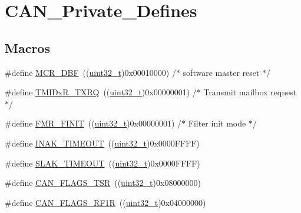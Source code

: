 \hypertarget{group___c_a_n___private___defines}{}\section{C\+A\+N\+\_\+\+Private\+\_\+\+Defines}
\label{group___c_a_n___private___defines}
\subsection*{Macros}
\begin{DoxyCompactItemize}
\item 
\#define \hyperlink{group___c_a_n___private___defines_ga1ded3736beb63c49281f2983fc68c36d}{M\+C\+R\+\_\+\+D\+BF}~((\hyperlink{_p_e___types_8h_a33594304e786b158f3fb30289278f5af}{uint32\+\_\+t})0x00010000) /$\ast$ software master reset $\ast$/
\item 
\#define \hyperlink{group___c_a_n___private___defines_gabeb6db5ba5c01da5084ec1605f868e18}{T\+M\+I\+Dx\+R\+\_\+\+T\+X\+RQ}~((\hyperlink{_p_e___types_8h_a33594304e786b158f3fb30289278f5af}{uint32\+\_\+t})0x00000001) /$\ast$ Transmit mailbox request $\ast$/
\item 
\#define \hyperlink{group___c_a_n___private___defines_ga6125d0273c466e402db1a8f5bf888857}{F\+M\+R\+\_\+\+F\+I\+N\+IT}~((\hyperlink{_p_e___types_8h_a33594304e786b158f3fb30289278f5af}{uint32\+\_\+t})0x00000001) /$\ast$ Filter init mode $\ast$/
\item 
\#define \hyperlink{group___c_a_n___private___defines_ga60a32132df242146efd3e9f7a079f0f0}{I\+N\+A\+K\+\_\+\+T\+I\+M\+E\+O\+UT}~((\hyperlink{_p_e___types_8h_a33594304e786b158f3fb30289278f5af}{uint32\+\_\+t})0x0000\+F\+F\+F\+F)
\item 
\#define \hyperlink{group___c_a_n___private___defines_ga1bb8107706c8b4039ac55a122f3c65bb}{S\+L\+A\+K\+\_\+\+T\+I\+M\+E\+O\+UT}~((\hyperlink{_p_e___types_8h_a33594304e786b158f3fb30289278f5af}{uint32\+\_\+t})0x0000\+F\+F\+F\+F)
\item 
\#define \hyperlink{group___c_a_n___private___defines_gac67e7d905ba11441bf9e14180805cf3a}{C\+A\+N\+\_\+\+F\+L\+A\+G\+S\+\_\+\+T\+SR}~((\hyperlink{_p_e___types_8h_a33594304e786b158f3fb30289278f5af}{uint32\+\_\+t})0x08000000)
\item 
\#define \hyperlink{group___c_a_n___private___defines_ga2a03d73273ab353c8deb3a4730431977}{C\+A\+N\+\_\+\+F\+L\+A\+G\+S\+\_\+\+R\+F1R}~((\hyperlink{_p_e___types_8h_a33594304e786b158f3fb30289278f5af}{uint32\+\_\+t})0x04000000)
\item 

\end{DoxyCompactItemize}
